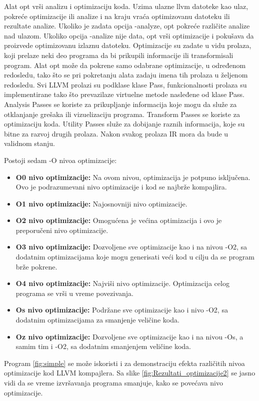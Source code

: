 \documentclass[a4paper]{article}
\begin{document}
Alat opt vrši analizu i optimizaciju koda. Uzima ulazne llvm datoteke kao ulaz, pokreće optimizacije ili analize i na kraju vraća optimizovanu datoteku ili rezultate analize. Ukoliko je zadata opcija -analyze, opt pokreće različite analize nad ulazom. Ukoliko opcija  -analize nije data, opt vrši optimizacije i pokušava da proizvede optimizovanu izlaznu datoteku. Optimizacije su zadate u vidu prolaza, koji prelaze neki deo programa da bi prikupili informacije ili transformisali program. Alat opt može da pokrene samo odabrane optimizacije, u određenom redosledu, tako što se pri pokretanju alata zadaju imena tih prolaza u željenom redosledu. Svi LLVM prolazi su podklase klase Pass, funkcionalnosti prolaza su implementirane tako što prevazilaze virtuelne metode nasleđene od klase Pass. Analysis Passes se koriste za prikupljanje informacija koje mogu da služe za otklanjanje grešaka ili vizuelizaciju programa. Transform Passes se koriste za optimizaciju koda. Utility Passes služe za dobijanje raznih informacija, koje su bitne za razvoj drugih prolaza. Nakon svakog prolaza IR mora da bude u validnom stanju.

Postoji sedam -O nivoa optimizacije: 
\begin{itemize}
\item \textbf{O0 nivo optimizacije:} Na ovom nivou, optimizacija je potpuno isključena. Ovo je podrazumevani nivo optimizacije i kod se najbrže kompajlira.
\item \textbf{O1 nivo optimizacije:} Najosnovniji nivo optimizacije.
\item \textbf{O2 nivo optimizacije:} Omogućena je većina optimizacija i ovo je preporučeni nivo optimizacije.
\item \textbf{O3 nivo optimizacije:} Dozvoljene sve optimizacije kao i na nivou -O2, sa dodatnim optimizacijama koje mogu generisati veći kod u cilju da se program brže pokrene.
\item \textbf{O4 nivo optimizacije:} Najviši nivo optimizacije. Optimizacija celog programa se vrši u vreme povezivanja. 
\item \textbf{Os nivo optimizacije:} Podržane sve optimizacije kao i nivo -O2, sa dodatnim optimizacijama za smanjenje veličine koda.
\item \textbf{Oz nivo optimizacije:} Dozvoljene sve optimizacije kao i na nivou -Os, a samim tim i -O2,  sa dodatnim smanjenjem veličine koda. \cite{opt} \cite{pass} \cite{pass2}
\end{itemize}

Program \ref{fig:simple} se može iskoristi i za demonstraciju efekta različitih nivoa optimizacije kod LLVM kompajlera. Sa slike \ref{fig:Rezultati_optimizacije2} se jasno vidi da se vreme izvršavanja programa smanjuje, kako se povećava nivo optimizacije.
\end{document}
